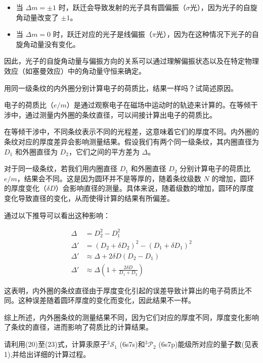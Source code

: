 \documentclass[dvipsnames, svgnames,a4paper,11pt]{article}
\begin{document}
	\begin{itemize}
		\item 当 $\Delta m = \pm1$ 时，跃迁会导致发射的光子具有圆偏振（$\sigma$光），因为光子的自旋角动量改变了 $\pm1$。
		\item 当 $\Delta m = 0$ 时，跃迁对应的光子是线偏振（$\pi$光），因为在这种情况下光子的自旋角动量没有变化。
	\end{itemize}
	
	因此，光子的自旋角动量与偏振方向的关系可以通过理解偏振状态以及在特定物理效应（如塞曼效应）中的角动量守恒来确定。
	
	\begin{question}
		用同一级条纹的内外圈分别计算电子的荷质比，结果一样吗？试简述原因。
	\end{question}
	电子的荷质比（$e/m$）是通过观察电子在磁场中运动时的轨迹来计算的。在等倾干涉中，通过测量内外圈的条纹直径，可以间接计算出电子的荷质比。

在等倾干涉中，不同条纹表示不同的光程差，这意味着它们的厚度不同。内外圈的条纹对应的厚度差异会影响测量结果。假设我们有两个同一级条纹，其内圈直径为 $D_1$ 和外圈直径为 $D_2$，它们之间的平方差为 $\Delta$。 

对于同一级条纹，若我们用内圈直径 $D_1$ 和外圈直径 $D_2$ 分别计算电子的荷质比 $e/m$，结果会不同。这是因为圆环并不是等厚的，随着条纹级数 $N$ 的增加，圆环的厚度变化（$\delta D$）会影响直径的测量。具体来说，随着级数的增加，圆环的厚度变化导致直径的变化，从而使得计算的结果有所偏差。

通过以下推导可以看出这种影响：

\begin{align*}
\Delta &= D_2^2 - D_1^2 \\
\Delta' &= (D_2 + \delta D_2)^2 - (D_1 + \delta D_1)^2 \\
\Delta' &\approx \Delta + 2\delta D (D_2 - D_1) \\
\Delta' &\approx \Delta \left(1 + \frac{2 \delta D}{D_1 + D_2}\right)
\end{align*}

这表明，内外圈的条纹直径由于厚度变化引起的误差导致计算出的电子荷质比不同。这种误差随着圆环厚度的变化而变化，因此结果不一样。

综上所述，内外圈条纹的测量结果不同，因为它们对应的厚度不同，厚度变化影响了条纹的直径，进而影响了荷质比的计算结果。

	\begin{question}
		请利用(20)至(23)式，计算汞原子$^3\mathcal{S}_1$ (6s7s)和$^3\mathcal{P}_2$ (6s7p)能级所对应的量子数(见表
1),并给出详细的计算过程。
	\end{question}
	
\end{document}
